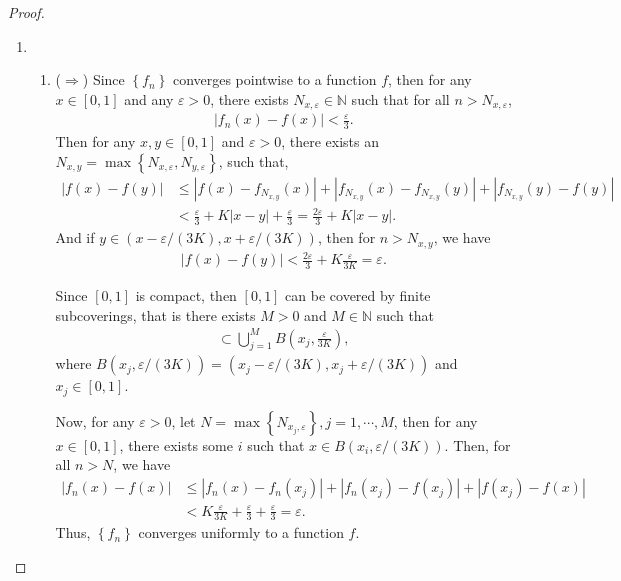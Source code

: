 \documentclass[11pt]{article}
\theoremstyle{definition}
\numberwithin{equation}{subsection}
\begin{document}
\begin{proof}
~\begin{enumerate}[label=(\alph*)]
    \item \begin{enumerate}[label=\arabic*)]
        \item ($\Rightarrow$) Since $\left\{f_n\right\}$ converges pointwise to a function $f$, then for any $x \in [0,1]$ and any $\varepsilon > 0$, there exists $N_{x, \varepsilon} \in \mathbb{N}$ such that for all $n > N_{x, \varepsilon}$, 
        \begin{align*}
            \left| f_n(x) - f(x) \right| < \frac{\varepsilon}{3}.
        \end{align*}
        Then for any $x, y \in [0,1]$ and $\varepsilon > 0$, there exists an $N_{x,y} = \max \left\{N_{x, \varepsilon}, N_{y, \varepsilon}\right\}$, such that, 
        \begin{align*}
            |f(x) - f(y)| & \leq \left|f(x) - f_{N_{x,y}}(x)\right| + \left|f_{N_{x,y}}(x) - f_{N_{x,y}}(y)\right| + \left|f_{N_{x,y}}(y) - f(y)\right| \\
            & < \frac{\varepsilon}{3} + K |x - y| + \frac{\varepsilon}{3} = \frac{2 \varepsilon}{3} + K |x - y|.
        \end{align*}
        And if $y \in \left(x - \varepsilon / (3K), x + \varepsilon / (3K) \right)$, then for $n > N_{x,y}$, we have 
        \begin{align*}
            |f(x) - f(y)| < \frac{2 \varepsilon}{3} + K \frac{\varepsilon}{3K} = \varepsilon.
        \end{align*}
    
        Since $[0,1]$ is compact, then $[0,1]$ can be covered by finite subcoverings, that is there exists $M > 0$ and $M \in \mathbb{N}$ such that
        \begin{align*}
            [0,1] \subset \bigcup^M_{j=1} B \left(x_j, \frac{\varepsilon}{3K} \right),
        \end{align*}
        where $B \left(x_j, \varepsilon / (3K)\right) = \left(x_j - \varepsilon / (3K), x_j + \varepsilon / (3K) \right)$ and $x_j \in [0,1]$.
    
        Now, for any $\varepsilon > 0$, let $N = \max \left\{ N_{x_j, \varepsilon} \right\}, j = 1, \cdots, M$, then for any $x \in [0,1]$, there exists some $i$ such that $x \in B \left(x_i, \varepsilon / (3K)\right)$. Then, for all $n > N$, we have
        \begin{align*}
            |f_n(x) - f(x)| & \leq |f_n(x) - f_n(x_j)| + |f_n(x_j) - f(x_j)| + |f(x_j) - f(x)| \\
            & < K \frac{\varepsilon}{3K} + \frac{\varepsilon}{3} + \frac{\varepsilon}{3} = \varepsilon.
        \end{align*}
        Thus, $\left\{f_n\right\}$ converges uniformly to a function $f$.
        

\end{enumerate}
\end{enumerate}
\end{proof}
\end{document}
